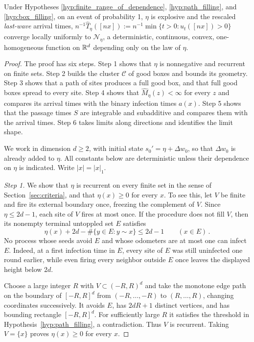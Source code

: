 \documentclass[12pt]{amsart}
\begin{document}
\begin{prop} \label{prop:convergence_of_the_generalized_last_wave}
	Under Hypotheses \ref{hyp:finite_range_of_dependence}, \ref{hyp:path_filling}, and \ref{hyp:box_filling},
	on an event of probability 1, $\eta$ is explosive and the rescaled {\it last-wave} arrival times, $n^{-1} \hat{T}_{\eta}([nx]) := n^{-1} \min \{ t > 0 : u_t([nx]) > 0\}$ converge locally uniformly to $\mathcal{N}_{\eta}$, a deterministic, continuous, convex, one-homogeneous function on $\mathbb{R}^d$
	depending only on the law of $\eta$.
\end{prop}
\begin{proof}
The proof has six steps. Step 1 shows that $\eta$ is nonnegative and recurrent on finite sets. Step 2 builds the cluster $\mathcal C$ of good boxes and bounds its geometry. Step 3 shows that a path of sites produces a full good box, and that full good boxes spread to every site. Step 4 shows that $\hat M_\eta(z)<\infty$ for every $z$ and compares its arrival times with the binary infection times $a(x)$. Step 5 shows that the passage times $S$ are integrable and subadditive and compares them with the arrival times. Step 6 takes limits along directions and identifies the limit shape.

We work in dimension $d\geq2$, with initial state $s_0'=\eta+\Delta w_0$, so that $\Delta w_0$ is already added to $\eta$. All constants below are deterministic unless their dependence on $\eta$ is indicated. Write $|x|=|x|_1$.

\emph{Step 1.} We show that $\eta$ is recurrent on every finite set in the sense of Section~\ref{sec:criteria}, and that $\eta(x)\geq0$ for every $x$. To see this, let $V$ be finite and fire its external boundary once, freezing the complement of $V$. Since $\eta\leq2d-1$, each site of $V$ fires at most once. If the procedure does not fill $V$, then its nonempty terminal untoppled set $E$ satisfies
\begin{equation*}
 \eta(x)+2d-\#\{y\in E:y\sim x\}\leq2d-1
 \qquad(x\in E)\,.
\end{equation*}
No process whose seeds avoid $E$ and whose odometers are at most one can infect $E$. Indeed, at a first infection time in $E$, every site of $E$ was still uninfected one round earlier, while even firing every neighbor outside $E$ once leaves the displayed height below $2d$.

Choose a large integer $R$ with $V\subset(-R,R)^d$ and take the monotone edge path on the boundary of $[-R,R]^d$ from $(-R,\ldots,-R)$ to $(R,\ldots,R)$, changing coordinates successively. It avoids $E$, has $2dR+1$ distinct vertices, and has bounding rectangle $[-R,R]^d$. For sufficiently large $R$ it satisfies the threshold in Hypothesis~\ref{hyp:path_filling}, a contradiction. Thus $V$ is recurrent. Taking $V=\{x\}$ proves $\eta(x)\geq0$ for every $x$.


\end{proof}
\end{document}

